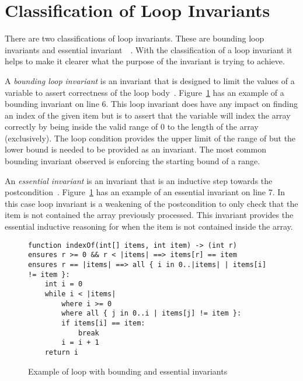 \section{Classification of Loop Invariants}

There are two classifications of loop invariants.
These are bounding loop invariants and essential invariant~\cite{invarints-classifiction}~\cite{loop-inv-survey}.
With the classification of a loop invariant it helps to make
it clearer what the purpose of the invariant is trying to achieve.

A \textit{bounding loop invariant} is an invariant that is designed
to limit the values of a variable to assert correctness of the loop
body~\cite{loop-inv-survey}.
Figure~\ref{lst:whiley-inv-class} has an example of a bounding invariant on
line 6. This loop invariant does have any impact on finding an index
of the given item but is to assert that the variable  will index
the array correctly by being inside the valid range of 0 to the length of
the array (exclusively).
The loop condition provides the upper limit of the range of  but
the lower bound is needed to be provided as an invariant.
The most common bounding invariant observed is enforcing the starting bound
of a range.

An \textit{essential invariant} is an invariant that is an inductive step towards the
postcondition\cite{invarints-classifiction}~\cite{loop-inv-survey}.
Figure~\ref{lst:whiley-inv-class} has an example of an essential invariant on
line 7.
In this case loop invariant is a weakening of the postcondition to only
check that the item is not contained the array previously processed.
This invariant provides the essential inductive reasoning for when the item is
not contained inside the array.

\begin{figure}[ht]
\begin{lstlisting}
function indexOf(int[] items, int item) -> (int r)
ensures r >= 0 && r < |items| ==> items[r] == item
ensures r == |items| ==> all { i in 0..|items| | items[i] != item }:
    int i = 0
    while i < |items|
        where i >= 0
        where all { j in 0..i | items[j] != item }:
        if items[i] == item:
            break
        i = i + 1
    return i
\end{lstlisting}
\caption{Example of loop with bounding and essential invariants}
\label{lst:whiley-inv-class}
\end{figure}


